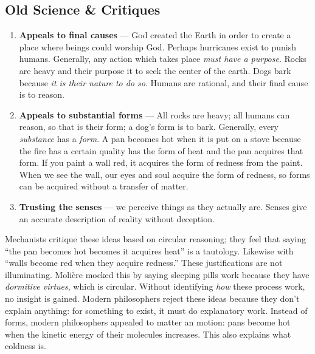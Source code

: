 \subsection{Old Science \textsc{\&} Critiques}
\begin{enumerate}
\item \textbf{Appeals to final causes} --- God created the Earth in order to create a place where beings could worship God. Perhaps hurricanes exist to punish humans. Generally, any action which takes place \emph{must have a purpose}. Rocks are heavy and their purpose it to seek the center of the earth. Dogs bark because \emph{it is their nature to do so}. Humans are rational, and their final cause is to reason.

\item \textbf{Appeals to substantial forms} --- All rocks are heavy; all humans can reason, so that is their form; a dog's form is to bark. Generally, every \emph{substance} has a \emph{form}. A pan becomes hot when it is put on a stove because the fire has a certain quality has the form of heat and the pan acquires that form. If you paint a wall red, it acquires the form of redness from the paint. When we see the wall, our eyes and soul acquire the form of redness, so forms can be acquired without a transfer of matter.

\item \textbf{Trusting the senses} --- we perceive things as they actually are. Senses give an accurate description of reality without deception.
\end{enumerate}

Mechanists critique these ideas based on circular reasoning; they feel that saying ``the pan becomes hot becomes it acquires heat'' is a tautology. Likewise with ``walls become red when they acquire redness.'' These justifications are not illuminating. Molière mocked this by saying sleeping pills work because they have \emph{dormitive virtues}, which is circular. Without identifying \emph{how} these process work, no insight is gained. Modern philosophers reject these ideas because they don't explain anything: for something to exist, it must do explanatory work. Instead of forms, modern philosophers appealed to matter an motion: pans become hot when the kinetic energy of their molecules increases. This also explains what coldness is.

